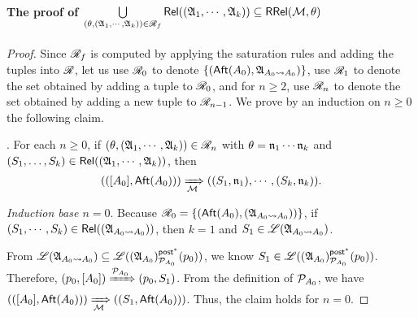 \paragraph*{The proof of $\bigcup \limits_{(\theta, ({\mathfrak{A} }_1, \cdots, {\mathfrak{A} }_k)) \in \mathscr{R}_f}  \mathsf{Rel}(({\mathfrak{A} }_1, \cdots, {\mathfrak{A} }_k)) \subseteq \mathsf{RRel}({\mathcal{M} }, \theta)$}


\begin{proof}
Since $\mathscr{R}_f$ is computed by applying the saturation rules and adding the tuples into $\mathscr{R}$,  let us use $\mathscr{R}_0$ to denote $\{({\sf Aft}(A_0), {\mathfrak{A} }_{A_0\rightsquigarrow A_0})\}$, use $\mathscr{R}_1$ to denote the set obtained by adding a tuple to $\mathscr{R}_0$, and for $n \ge 2$, use $\mathscr{R}_n$ to denote the set obtained by adding a new tuple to $\mathscr{R}_{n-1}$. 
We prove by an induction on $n \ge 0$ the following claim.  

\smallskip
{}. For each $n \ge 0$, if $(\theta, ({\mathfrak{A} }_1, \cdots, {\mathfrak{A} }_k)) \in \mathscr{R}_n$ with $\theta = \mathfrak{n}_1 \cdots \mathfrak{n}_k$ and $(S_1,\dots,S_k) \in \mathsf{Rel}(({\mathfrak{A} }_1, \cdots, {\mathfrak{A} }_k))$, then $$(([A_0], {\sf Aft}(A_0))) \xRightarrow[{\mathcal{M} }]{} ((S_1, \mathfrak{n}_1), \cdots, (S_k, \mathfrak{n}_k)).$$

\smallskip



\noindent \emph{Induction base $n = 0$}. 
Because $\mathscr{R}_0 = \{({\sf Aft}(A_0),({\mathfrak{A} }_{A_0\rightsquigarrow A_0}))\}$, if $(S_1, \cdots, S_k) \in \mathsf{Rel}(({\mathfrak{A} }_{A_0\rightsquigarrow A_0}))$, then $k=1$ and $S_1 \in{\mathscr{L} }({\mathfrak{A} }_{A_0\rightsquigarrow A_0})$. 

From ${\mathscr{L} }({\mathfrak{A} }_{A_0\rightsquigarrow A_0}) \subseteq {\mathscr{L} }(({\mathfrak{A} }_{A_0})^{{\mathsf{post} }^*}_{{\mathcal{P} }_{A_0}}(p_0))$, we know $S_1\in {\mathscr{L} }(({\mathfrak{A} }_{A_0})^{{\mathsf{post} }^*}_{{\mathcal{P} }_{A_0}}(p_0))$. Therefore, $(p_0,[A_0])\xRightarrow{{\mathcal{P} }_{A_0}}(p_0,S_1)$. From the definition of ${\mathcal{P} }_{A_0}$, we have $(([A_0], {\sf Aft}(A_0))) \xRightarrow[{\mathcal{M} }]{} ((S_1, {\sf Aft}(A_0)))$. Thus, the claim holds for $n = 0$. 


\end{proof}
